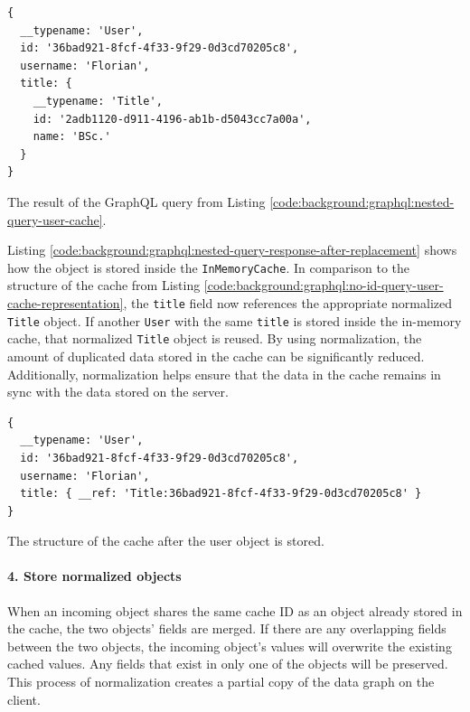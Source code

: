 \ifshowListings
\begin{listing}[H]
    \begin{verbatim}
{
  __typename: 'User',
  id: '36bad921-8fcf-4f33-9f29-0d3cd70205c8',
  username: 'Florian',
  title: {
    __typename: 'Title',
    id: '2adb1120-d911-4196-ab1b-d5043cc7a00a',
    name: 'BSc.'
  }
}
    \end{verbatim}
    \caption{The result of the GraphQL query from Listing \ref{code:background:graphql:nested-query-user-cache}.} \label{code:background:graphql:nested-query-response-user-cache}
\end{listing}
\fi

\noindent Listing \ref{code:background:graphql:nested-query-response-after-replacement} shows how the object is stored inside the \texttt{InMemoryCache}. In comparison to the structure of the cache from Listing \ref{code:background:graphql:no-id-query-user-cache-representation}, the \texttt{title} field now references the appropriate normalized \texttt{Title} object. If another \texttt{User} with the same \texttt{title} is stored inside the in-memory cache, that normalized \texttt{Title} object is reused. By using normalization, the amount of duplicated data stored in the cache can be significantly reduced. Additionally, normalization helps ensure that the data in the cache remains in sync with the data stored on the server.

\ifshowListings
\begin{listing}[H]
  \begin{verbatim}
{
  __typename: 'User',
  id: '36bad921-8fcf-4f33-9f29-0d3cd70205c8',
  username: 'Florian',
  title: { __ref: 'Title:36bad921-8fcf-4f33-9f29-0d3cd70205c8' }
}
  \end{verbatim}
  \caption{The structure of the cache after the user object is stored.}\label{code:background:graphql:nested-query-response-after-replacement}
\end{listing}
\fi

\paragraph{4. Store normalized objects}\label{paragraph:background:graphql:apollo-server-client:data-normalization:store-normalized-objects}

When an incoming object shares the same cache \ac{ID} as an object already stored in the cache, the two objects' fields are merged. If there are any overlapping fields between the two objects, the incoming object's values will overwrite the existing cached values. Any fields that exist in only one of the objects will be preserved. This process of normalization creates a partial copy of the data graph on the client. \cite{misc:-:background:graphql:apollo-client-cache-overview}

